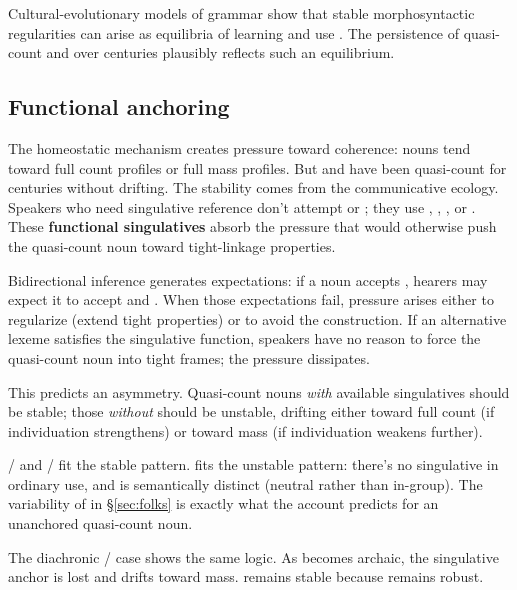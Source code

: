 \documentclass[12pt,a4paper]{article}
\begin{document}
Cultural-evolutionary models of grammar show that stable morphosyntactic regularities can arise as equilibria of learning and use \citep{kirby2008}. The persistence of quasi-count  and  over centuries plausibly reflects such an equilibrium.

\subsection{Functional anchoring}\label{sec:anchoring}

The homeostatic mechanism creates pressure toward coherence: nouns tend toward full count profiles or full mass profiles. But  and  have been quasi-count for centuries without drifting. The stability comes from the communicative ecology. Speakers who need singulative reference don't attempt  or ; they use , , , or . These \textbf{functional singulatives} absorb the pressure that would otherwise push the quasi-count noun toward tight-linkage properties.

Bidirectional inference generates expectations: if a noun accepts , hearers may expect it to accept  and . When those expectations fail, pressure arises either to regularize (extend tight properties) or to avoid the construction. If an alternative lexeme satisfies the singulative function, speakers have no reason to force the quasi-count noun into tight frames; the pressure dissipates.

This predicts an asymmetry. Quasi-count nouns \textit{with} available singulatives should be stable; those \textit{without} should be unstable, drifting either toward full count (if individuation strengthens) or toward mass (if individuation weakens further).

/ and / fit the stable pattern.  fits the unstable pattern: there's no singulative  in ordinary use, and  is semantically distinct (neutral rather than in-group). The variability of  in \S\ref{sec:folks} is exactly what the account predicts for an unanchored quasi-count noun.

The diachronic / case shows the same logic. As  becomes archaic, the singulative anchor is lost and  drifts toward mass.  remains stable because  remains robust.
\end{document}
